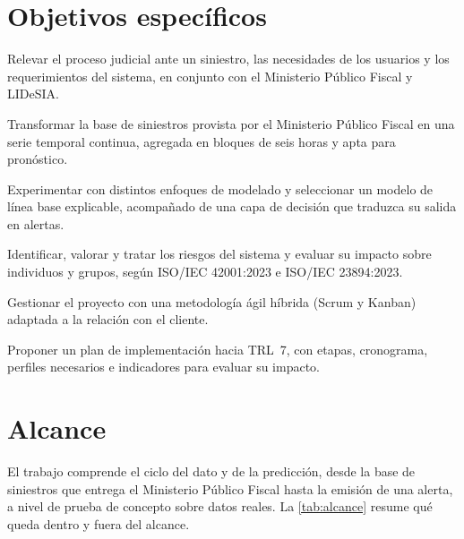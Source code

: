 \section{Objetivos específicos}\label{sec:objetivos-especificos}

\begin{description}[leftmargin=3.2em,labelwidth=2.6em,labelsep=0.6em,itemsep=2pt]
  \item[OE1.] Relevar el proceso judicial ante un siniestro, las necesidades de los usuarios y los requerimientos del sistema, en conjunto con el Ministerio Público Fiscal y LIDeSIA.
  \item[OE2.] Transformar la base de siniestros provista por el Ministerio Público Fiscal en una serie temporal continua, agregada en bloques de seis horas y apta para pronóstico.
  \item[OE3.] Experimentar con distintos enfoques de modelado y seleccionar un modelo de línea base explicable, acompañado de una capa de decisión que traduzca su salida en alertas.
  \item[OE4.] Identificar, valorar y tratar los riesgos del sistema y evaluar su impacto sobre individuos y grupos, según ISO/IEC 42001:2023 e ISO/IEC 23894:2023.
  \item[OE5.] Gestionar el proyecto con una metodología ágil híbrida (Scrum y Kanban) adaptada a la relación con el cliente.
  \item[OE6.] Proponer un plan de implementación hacia TRL~7, con etapas, cronograma, perfiles necesarios e indicadores para evaluar su impacto.
\end{description}

\section{Alcance}\label{sec:alcance}

El trabajo comprende el ciclo del dato y de la predicción, desde la base de siniestros que entrega el Ministerio Público Fiscal hasta la emisión de una alerta, a nivel de prueba de concepto sobre datos reales. La \cref{tab:alcance} resume qué queda dentro y fuera del alcance.

